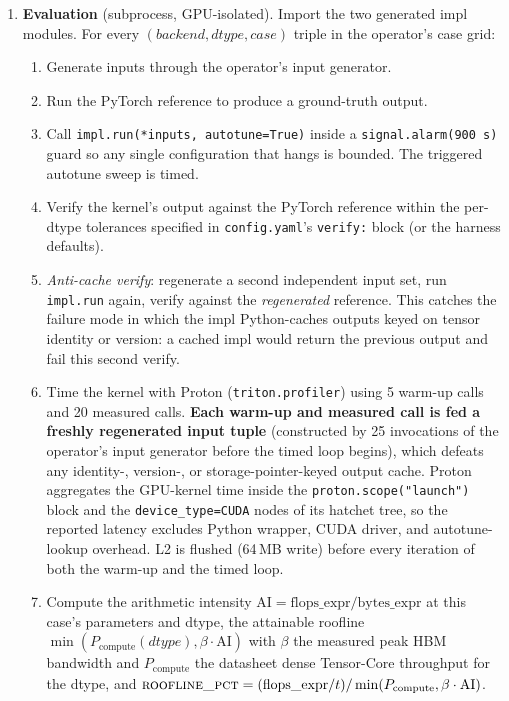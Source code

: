 \documentclass[11pt]{article}
\begin{document}
\begin{enumerate}[leftmargin=*, label=\arabic*.]
    \item \textbf{Evaluation} (subprocess, GPU-isolated). Import the two
    generated impl modules. For every $(backend, dtype, case)$ triple in
    the operator's case grid:
    \begin{enumerate}[label=\alph*., leftmargin=*]
        \item Generate inputs through the operator's input generator.
        \item Run the PyTorch reference to produce a ground-truth output.
        \item Call \texttt{impl.run(*inputs, autotune=True)} inside a
        \texttt{signal.alarm(900\,s)} guard so any single configuration
        that hangs is bounded. The triggered autotune sweep is timed.
        \item Verify the kernel's output against the PyTorch reference
        within the per-dtype tolerances specified in
        \texttt{config.yaml}'s \texttt{verify:} block (or the harness
        defaults).
        \item \emph{Anti-cache verify}: regenerate a second independent
        input set, run \texttt{impl.run} again, verify against the
        \emph{regenerated} reference. This catches the failure mode in
        which the impl Python-caches outputs keyed on tensor identity
        or version: a cached impl would return the previous output and
        fail this second verify.
        \item Time the kernel with Proton (\texttt{triton.profiler})
        using 5 warm-up calls and 20 measured calls. \textbf{Each
        warm-up and measured call is fed a freshly regenerated input
        tuple} (constructed by 25 invocations of the operator's input
        generator before the timed loop begins), which defeats any
        identity-, version-, or storage-pointer-keyed output cache.
        Proton aggregates the GPU-kernel time inside the
        \texttt{proton.scope("launch")} block and the
        \texttt{device\_type=CUDA} nodes of its hatchet tree, so the
        reported latency excludes Python wrapper, CUDA driver, and
        autotune-lookup overhead. L2 is flushed (64\,MB write) before
        every iteration of both the warm-up and the timed loop.
        \item Compute the arithmetic intensity
        $\text{AI} = \text{flops\_expr} / \text{bytes\_expr}$ at this
        case's parameters and dtype, the attainable roofline
        $\min(P_{\text{compute}}(dtype), \beta \cdot \text{AI})$ with
        $\beta$ the measured peak HBM bandwidth and $P_{\text{compute}}$
        the datasheet dense Tensor-Core throughput for the dtype, and
        $\textsc{roofline\_pct} =
        (\text{flops\_expr} / t) / \min(P_{\text{compute}}, \beta \cdot
        \text{AI})$.
    \end{enumerate}


\end{enumerate}
\end{document}
